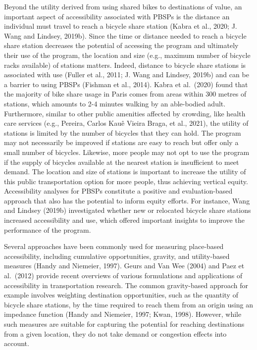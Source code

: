 \documentclass[]{elsarticle} %
\begin{document}
Beyond the utility derived from using shared bikes to destinations of
value, an important aspect of accessibility associated with PBSPs is the
distance an individual must travel to reach a bicycle share station
(Kabra et al., 2020; J. Wang and Lindsey, 2019b). Since the time or
distance needed to reach a bicycle share station decreases the potential
of accessing the program and ultimately their use of the program, the
location and size (e.g., maximum number of bicycle racks available) of
stations matters. Indeed, distance to bicycle share stations is
associated with use (Fuller et al., 2011; J. Wang and Lindsey, 2019b)
and can be a barrier to using PBSPs (Fishman et al., 2014). Kabra et
al.~(2020) found that the majority of bike share usage in Paris comes
from areas within 300 metres of stations, which amounts to 2-4 minutes
walking by an able-bodied adult. Furthermore, similar to other public
amenities affected by crowding, like health care services (e.g.,
Pereira, Carlos Kauê Vieira Braga, et al., 2021), the utility of
stations is limited by the number of bicycles that they can hold. The
program may not necessarily be improved if stations are easy to reach
but offer only a small number of bicycles. Likewise, more people may not
opt to use the program if the supply of bicycles available at the
nearest station is insufficient to meet demand. The location and size of
stations is important to increase the utility of this public
transportation option for more people, thus achieving vertical equity.
Accessibility analyses for PBSPs constitute a positive and
evaluation-based approach that also has the potential to inform equity
efforts. For instance, Wang and Lindsey (2019b) investigated whether new
or relocated bicycle share stations increased accessibility and use,
which offered important insights to improve the performance of the
program.

Several approaches have been commonly used for measuring place-based
accessibility, including cumulative opportunities, gravity, and
utility-based measures (Handy and Niemeier, 1997). Geurs and Van Wee
(2004) and Paez et al.~(2012) provide recent overviews of various
formulations and applications of accessibility in transportation
research. The common gravity-based approach for example involves
weighting destination opportunities, such as the quantity of bicycle
share stations, by the time required to reach them from an origin using
an impedance function (Handy and Niemeier, 1997; Kwan, 1998). However,
while such measures are suitable for capturing the potential for
reaching destinations from a given location, they do not take demand or
congestion effects into account.
\end{document}
